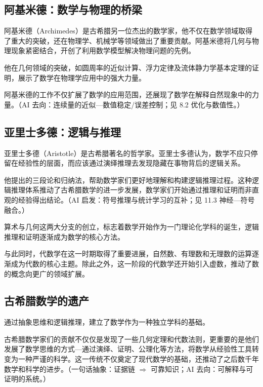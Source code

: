 \subsection{阿基米德：数学与物理的桥梁}


阿基米德（Archimedes）是古希腊另一位杰出的数学家，他不仅在数学领域取得了重大的突破，还在物理学、机械学等领域做出了重要贡献。阿基米德将几何与物理现象紧密结合，开创了利用数学模型解决物理问题的先例。

他在几何领域的突破，如圆周率的近似计算、浮力定律及流体静力学基本定理的证明，展示了数学在物理学应用中的强大力量。

阿基米德的工作不仅扩展了数学的应用范围，还展现了数学在解释自然现象中的力量。{（AI 去向：连续量的近似—数值稳定/误差控制；见 8.2 优化与数值性。）}

\subsection{亚里士多德：逻辑与推理}


亚里士多德（Aristotle）是古希腊著名的哲学家。亚里士多德认为，数学不应只停留在经验性的层面，而应该通过演绎推理去发现隐藏在事物背后的逻辑关系。

他提出的三段论和归纳法，帮助数学家们更好地理解和构建逻辑推理过程。这种逻辑推理体系推动了古希腊数学的进一步发展，数学家们开始通过推理和证明而非直观的经验得出结论。{（AI 启发：符号推理与统计学习的互补；见 11.3 神经—符号融合。）}

算术与几何这两大分支的创立，标志着数学开始作为一门理论化学科的诞生，逻辑推理和证明逐渐成为数学的核心方法。

与此同时，代数学在这一时期取得了重要进展，自然数、有理数和无理数的运算逐渐成为代数的核心主题。除此之外，这一阶段的代数学还开始引入虚数，推动了数的概念向更广的领域扩展。

\subsection{古希腊数学的遗产}


通过抽象思维和逻辑推理，建立了数学作为一种独立学科的基础。

古希腊数学家们的贡献不仅仅是发现了一些几何定理和代数法则，更重要的是他们发展了数学思维的方式---通过演绎、证明、公理化等方法，将数学从经验性工具转变为一种严谨的科学。这一传统不仅奠定了现代数学的基础，还推动了之后数千年数学和科学的进步。{（一句话抽象：证据链 $\Rightarrow$ 可靠知识；AI 去向：可解释与可证明的系统。）}

